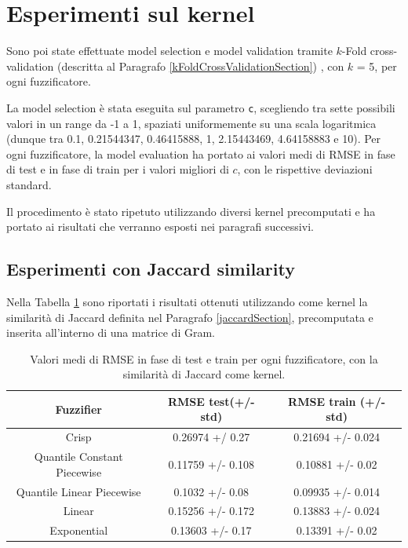 \documentclass[12pt,a4paper]{report}
\begin{document}
\section{Esperimenti sul kernel}

Sono poi state effettuate model selection e model validation tramite $k$-Fold cross-validation (descritta al Paragrafo \ref{kFoldCrossValidationSection}) , con $k$ = 5, per ogni fuzzificatore.

La model selection è stata eseguita sul parametro \texttt{c}, scegliendo tra sette possibili valori in un range da -1 a 1, spaziati uniformemente su una scala logaritmica (dunque tra 0.1, 0.21544347, 0.46415888,  1,  2.15443469, 4.64158883 e 10).
Per ogni fuzzificatore, la model evaluation ha portato ai valori medi di RMSE in fase di test e in fase di train per i valori migliori di $c$, con le rispettive deviazioni standard.

Il procedimento è stato ripetuto utilizzando diversi kernel precomputati e ha portato ai risultati che verranno esposti nei paragrafi successivi.

\subsection{Esperimenti con Jaccard similarity}
Nella Tabella \ref{table:risultatiJaccard} sono riportati i  risultati ottenuti utilizzando come kernel la similarità di Jaccard definita nel Paragrafo \ref{jaccardSection}, precomputata e inserita all'interno di una matrice di Gram.

\begin{table}[h!]
\small
\centering 	
	\begin{tabular}{|c|c|c|}
	 \hline
	 Fuzzifier & RMSE test(+/- std) & RMSE train (+/- std)\\ [0.5ex] 
	 \hline
	 Crisp & 0.26974 +/ 0.27 & 0.21694 +/- 0.024 \\ 
	 \hline
	 Quantile Constant Piecewise & 0.11759 +/- 0.108 & 0.10881 +/- 0.02\\
	 \hline
	 Quantile Linear Piecewise & 0.1032 +/- 0.08 & 0.09935 +/- 0.014\\
	 \hline
	 Linear & 0.15256 +/- 0.172 & 0.13883 +/- 0.024\\
	 \hline
	 Exponential  & 0.13603 +/- 0.17 & 0.13391 +/- 0.02\\ [1ex] 
	 \hline
	\end{tabular}
\caption{Valori medi di RMSE in fase di test e train per ogni fuzzificatore, con la similarità di Jaccard come kernel.}
\label{table:risultatiJaccard}
\end{table}
\end{document}
